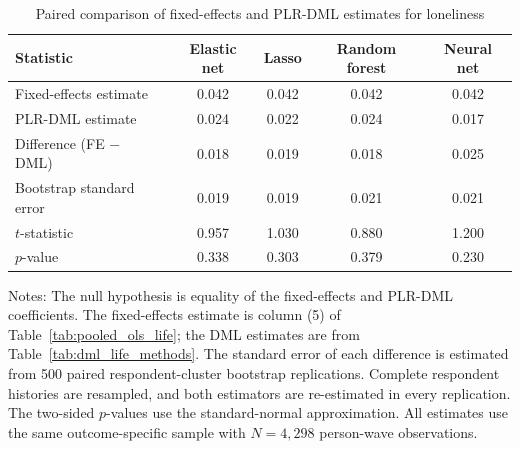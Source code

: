 \begin{table}[!htbp]
\centering
\caption{Paired comparison of fixed-effects and PLR-DML estimates for loneliness}
\label{tab:fe_plr_comparison_loneliness}
\small
\setlength{\tabcolsep}{5pt}
\begin{tabular}{lcccc}
\hline
Statistic & Elastic net & Lasso & Random forest & Neural net
\\
\hline
Fixed-effects estimate & 0.042 & 0.042 & 0.042 & 0.042
\\
PLR-DML estimate & 0.024 & 0.022 & 0.024 & 0.017
\\
Difference (FE $-$ DML) & 0.018 & 0.019 & 0.018 & 0.025
\\
Bootstrap standard error & 0.019 & 0.019 & 0.021 & 0.021
\\
$t$-statistic & 0.957 & 1.030 & 0.880 & 1.200
\\
$p$-value & 0.338 & 0.303 & 0.379 & 0.230
\\
\hline
\end{tabular}
\begin{minipage}{0.96\textwidth}
\footnotesize Notes: The null hypothesis is equality of the fixed-effects and PLR-DML coefficients. The fixed-effects estimate is column (5) of Table~\ref{tab:pooled_ols_life}; the DML estimates are from Table~\ref{tab:dml_life_methods}. The standard error of each difference is estimated from 500 paired respondent-cluster bootstrap replications. Complete respondent histories are resampled, and both estimators are re-estimated in every replication. The two-sided $p$-values use the standard-normal approximation. All estimates use the same outcome-specific sample with $N=4,298$ person-wave observations.
\end{minipage}
\end{table}
